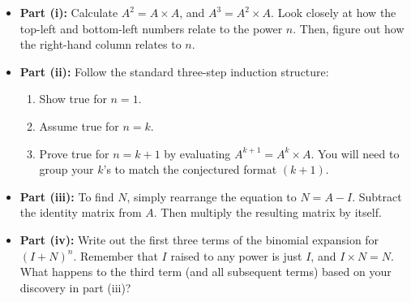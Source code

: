\begin{hint}
\begin{itemize}
    \item \textbf{Part (i):} Calculate $A^2 = A \times A$, and $A^3 = A^2 \times A$. Look closely at how the top-left and bottom-left numbers relate to the power $n$. Then, figure out how the right-hand column relates to $n$.
    \item \textbf{Part (ii):} Follow the standard three-step induction structure: 
    \begin{enumerate}
        \item Show true for $n=1$.
        \item Assume true for $n=k$.
        \item Prove true for $n=k+1$ by evaluating $A^{k+1} = A^k \times A$. You will need to group your $k$'s to match the conjectured format $(k+1)$.
    \end{enumerate}
    \item \textbf{Part (iii):} To find $N$, simply rearrange the equation to $N = A - I$. Subtract the identity matrix from $A$. Then multiply the resulting matrix by itself.
    \item \textbf{Part (iv):} Write out the first three terms of the binomial expansion for $(I+N)^n$. Remember that $I$ raised to any power is just $I$, and $I \times N = N$. What happens to the third term (and all subsequent terms) based on your discovery in part (iii)?
\end{itemize}
\end{hint}

